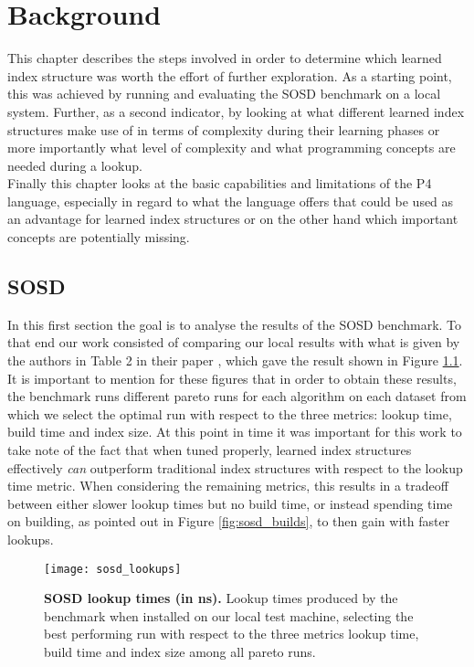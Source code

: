 
\chapter{Background}
\label{ch:background}
This chapter describes the steps involved in order to determine which learned index structure was worth the effort of further exploration. As a starting point, this was achieved by running and evaluating the SOSD benchmark \cite{sosd-neurips} on a local system. Further, as a second indicator, by looking at what different learned index structures make use of in terms of complexity during their learning phases or more importantly what level of complexity and what programming concepts are needed during a lookup.\\

Finally this chapter looks at the basic capabilities and limitations of the P4 language, especially in regard to what the language offers that could be used as an advantage for learned index structures or on the other hand which important concepts are potentially missing.

\section{SOSD}
In this first section the goal is to analyse the results of the SOSD benchmark. To that end our work consisted of comparing our local results with what is given by the authors in Table 2 in their paper \cite{sosd-neurips}, which gave the result shown in Figure \ref{fig:sosd_lookups}. It is important to mention for these figures that in order to obtain these results, the benchmark runs different pareto runs for each algorithm on each dataset from which we select the optimal run with respect to the three metrics: lookup time, build time and index size. At this point in time it was important for this work to take note of the fact that when tuned properly, learned index structures effectively \emph{can} outperform traditional index structures with respect to the lookup time metric. When considering the remaining metrics, this results in a tradeoff between either slower lookup times but no build time, or instead spending time on building, as pointed out in Figure \ref{fig:sosd_builds}, to then gain with faster lookups.

\begin{figure}[!ht]
\centering
\texttt{[image: sosd\_lookups]}
\caption[SOSD Lookups]{
  \textbf{SOSD lookup times (in ns).}
  Lookup times produced by the benchmark when installed on our local test machine, selecting the best performing run with respect to the three metrics lookup time, build time and index size among all pareto runs.
}
\label{fig:sosd_lookups}
\end{figure}

